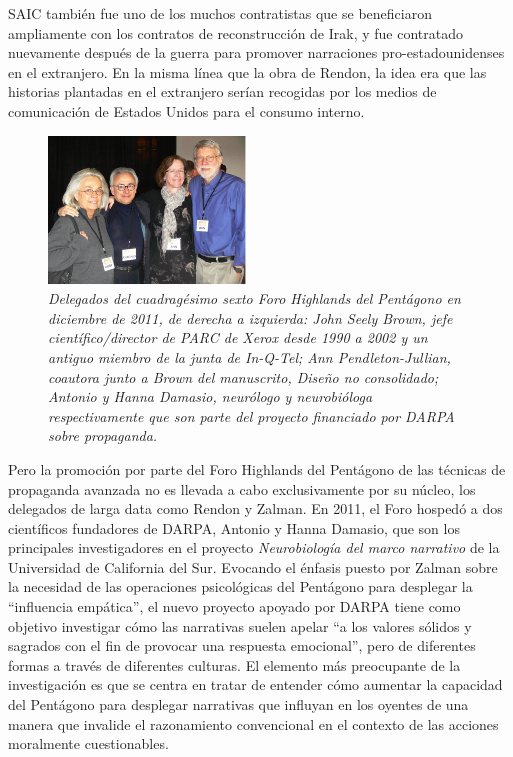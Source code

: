 \documentclass[10pt,a5paper,twoside,spanish,]{book}
\begin{document}
SAIC también fue uno de los muchos contratistas que se beneficiaron
ampliamente con los contratos de reconstrucción de Irak, y fue
contratado nuevamente después de la guerra para promover narraciones
pro-estadounidenses en el extranjero. En la misma línea que la obra de
Rendon, la idea era que las historias plantadas en el extranjero serían
recogidas por los medios de comunicación de Estados Unidos para el
consumo interno.

\begin{figure}[htbp]
\centering
\includegraphics{2.6.png}
\caption{\emph{Delegados del cuadragésimo sexto Foro Highlands del
Pentágono en diciembre de 2011, de derecha a izquierda: John Seely
Brown, jefe científico/director de PARC de Xerox desde 1990 a 2002 y un
antiguo miembro de la junta de In-Q-Tel; Ann Pendleton-Jullian, coautora
junto a Brown del manuscrito, Diseño no consolidado; Antonio y Hanna
Damasio, neurólogo y neurobióloga respectivamente que son parte del
proyecto financiado por DARPA sobre propaganda.}}
\end{figure}

Pero la promoción por parte del Foro Highlands del Pentágono de las
técnicas de propaganda avanzada no es llevada a cabo exclusivamente por
su núcleo, los delegados de larga data como Rendon y Zalman. En 2011, el
Foro hospedó a dos científicos fundadores de DARPA, Antonio y Hanna
Damasio, que son los principales investigadores en el proyecto
\emph{Neurobiología del marco narrativo} de la Universidad de California
del Sur. Evocando el énfasis puesto por Zalman sobre la necesidad de las
operaciones psicológicas del Pentágono para desplegar la ``influencia
empática'', el nuevo proyecto apoyado por DARPA tiene como objetivo
investigar cómo las narrativas suelen apelar ``a los valores sólidos y
sagrados con el fin de provocar una respuesta emocional'', pero de
diferentes formas a través de diferentes culturas. El elemento más
preocupante de la investigación es que se centra en tratar de entender
cómo aumentar la capacidad del Pentágono para desplegar narrativas que
influyan en los oyentes de una manera que invalide el razonamiento
convencional en el contexto de las acciones moralmente cuestionables.
\end{document}
